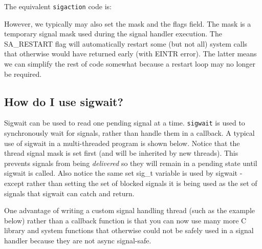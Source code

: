 The equivalent \texttt{sigaction} code is:

\begin{Shaded}
\begin{Highlighting}[]
 
\NormalTok{; }
\end{Highlighting}
\end{Shaded}

However, we typically may also set the mask and the flags field. The
mask is a temporary signal mask used during the signal handler
execution. The SA\_RESTART flag will automatically restart some (but not
all) system calls that otherwise would have returned early (with EINTR
error). The latter means we can simplify the rest of code somewhat
because a restart loop may no longer be required.

\begin{Shaded}
\begin{Highlighting}[]
\end{Highlighting}
\end{Shaded}

\subsection{How do I use sigwait?}\label{how-do-i-use-sigwait}

Sigwait can be used to read one pending signal at a time.
\texttt{sigwait} is used to synchronously wait for signals, rather than
handle them in a callback. A typical use of sigwait in a multi-threaded
program is shown below. Notice that the thread signal mask is set first
(and will be inherited by new threads). This prevents signals from being
\emph{delivered} so they will remain in a pending state until sigwait is
called. Also notice the same set sig\_t variable is used by sigwait -
except rather than setting the set of blocked signals it is being used
as the set of signals that sigwait can catch and return.

One advantage of writing a custom signal handling thread (such as the
example below) rather than a callback function is that you can now use
many more C library and system functions that otherwise could not be
safely used in a signal handler because they are not async signal-safe.

